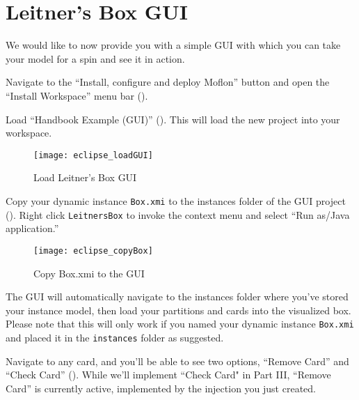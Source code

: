 \newpage
\section{Leitner's Box GUI}
\genHeader

We would like to now provide you with a simple GUI with which you can take your model for a spin and see it in action.

\begin{stepbystep}

\item Navigate to the ``Install, configure and deploy Moflon'' button and open the ``Install Workspace'' menu bar ().

\item Load ``Handbook Example (GUI)'' (). This will load the new project into your workspace. 

\begin{figure}[htbp]
    \centering
    \texttt{[image: eclipse\_loadGUI]}
    \caption{Load Leitner's Box GUI}
    \label{eclipse:GUI_load}
\end{figure}

\item Copy your dynamic instance \texttt{Box.xmi} to the instances folder of the GUI project (). Right click \texttt{LeitnersBox} to invoke the context menu and select ``Run as/Java application.''

\begin{figure}[htbp]
    \centering
    \texttt{[image: eclipse\_copyBox]}
    \caption{Copy Box.xmi to the GUI}
    \label{eclipse:Copy_instance}
\end{figure}

\item The GUI will automatically navigate to the instances folder where you've stored your instance model, then load your partitions and
cards into the visualized box. Please note that this will only work if you named your dynamic instance \texttt{Box.xmi} and placed it in the \texttt{instances}
folder as suggested.

\vspace{0.5cm}

\item Navigate to any card, and you'll be able to see two options, ``Remove Card'' and ``Check Card''
(). While we'll implement ``Check Card" in Part III, ``Remove Card'' is currently active, implemented by the injection you
just created.


\end{stepbystep}
